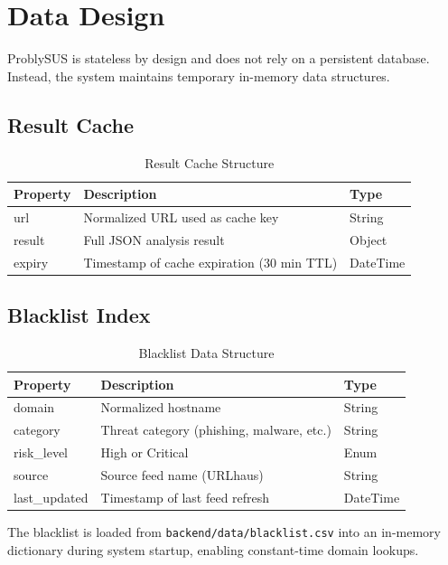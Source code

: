 \section{Data Design}

ProblySUS is stateless by design and does not rely on a persistent database. Instead, the system maintains temporary in-memory data structures.

\subsection{Result Cache}

\begin{table}[h]
\centering
\begin{tabular}{|lll|}
\toprule
Property & Description & Type \\
\midrule
url & Normalized URL used as cache key & String \\
result & Full JSON analysis result & Object \\
expiry & Timestamp of cache expiration (30 min TTL) & DateTime \\
\bottomrule
\end{tabular}
\caption{Result Cache Structure}
\end{table}

\subsection{Blacklist Index}

\begin{table}[h]
\centering
\begin{tabular}{|lll|}
\toprule
Property & Description & Type \\
\midrule
domain & Normalized hostname & String \\
category & Threat category (phishing, malware, etc.) & String \\
risk\_level & High or Critical & Enum \\
source & Source feed name (URLhaus) & String \\
last\_updated & Timestamp of last feed refresh & DateTime \\
\bottomrule
\end{tabular}
\caption{Blacklist Data Structure}
\end{table}

The blacklist is loaded from \texttt{backend/data/blacklist.csv} into an in-memory dictionary during system startup, enabling constant-time domain lookups.

